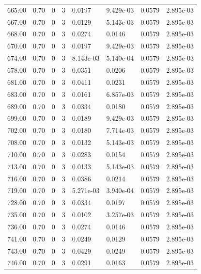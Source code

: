 \documentclass[preview]{standalone}
\begin{document}
{{{{{{\begin{tabular}{L{1.2cm}C{1.2cm} C{0.3cm}C{0.5cm} C{1.4cm}C{1.4cm} C{1.4cm}C{1.4cm}}
  665.00  &  0.70  & 0     &  3 &  0.0197  & 9.429e-03  & 0.0579 &  2.895e-03   \\ 
  667.00  &  0.70  & 0     &  3 &  0.0129  & 5.143e-03  & 0.0579 &  2.895e-03   \\ 
  668.00  &  0.70  & 0     &  3 &  0.0274  & 0.0146  & 0.0579 &  2.895e-03   \\ 
  670.00  &  0.70  & 0     &  3 &  0.0197  & 9.429e-03  & 0.0579 &  2.895e-03   \\ 
  674.00  &  0.70  & 0     &  3 &  8.143e-03  & 5.140e-04  & 0.0579 &  2.895e-03   \\ 
  678.00  &  0.70  & 0     &  3 &  0.0351  & 0.0206  & 0.0579 &  2.895e-03   \\ 
  681.00  &  0.70  & 0     &  3 &  0.0411  & 0.0231  & 0.0579 &  2.895e-03   \\ 
  683.00  &  0.70  & 0     &  3 &  0.0161  & 6.857e-03  & 0.0579 &  2.895e-03   \\ 
  689.00  &  0.70  & 0     &  3 &  0.0334  & 0.0180  & 0.0579 &  2.895e-03   \\ 
  699.00  &  0.70  & 0     &  3 &  0.0189  & 9.429e-03  & 0.0579 &  2.895e-03   \\ 
  702.00  &  0.70  & 0     &  3 &  0.0180  & 7.714e-03  & 0.0579 &  2.895e-03   \\ 
  708.00  &  0.70  & 0     &  3 &  0.0132  & 5.143e-03  & 0.0579 &  2.895e-03   \\ 
  710.00  &  0.70  & 0     &  3 &  0.0283  & 0.0154  & 0.0579 &  2.895e-03   \\ 
  713.00  &  0.70  & 0     &  3 &  0.0133  & 5.143e-03  & 0.0579 &  2.895e-03   \\ 
  716.00  &  0.70  & 0     &  3 &  0.0386  & 0.0214  & 0.0579 &  2.895e-03   \\ 
  719.00  &  0.70  & 0     &  3 &  5.271e-03  & 3.940e-04  & 0.0579 &  2.895e-03   \\ 
  728.00  &  0.70  & 0     &  3 &  0.0334  & 0.0197  & 0.0579 &  2.895e-03   \\ 
  735.00  &  0.70  & 0     &  3 &  0.0102  & 3.257e-03  & 0.0579 &  2.895e-03   \\ 
  736.00  &  0.70  & 0     &  3 &  0.0274  & 0.0146  & 0.0579 &  2.895e-03   \\ 
  741.00  &  0.70  & 0     &  3 &  0.0249  & 0.0129  & 0.0579 &  2.895e-03   \\ 
  743.00  &  0.70  & 0     &  3 &  0.0429  & 0.0249  & 0.0579 &  2.895e-03   \\ 
  746.00  &  0.70  & 0     &  3 &  0.0291  & 0.0163  & 0.0579 &  2.895e-03   \\ 

\end{tabular}}}}}}}
\end{document}
